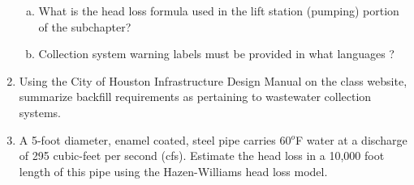 \documentclass[12pt]{article}
\begin{document}
\begin{enumerate}
\begin{enumerate}[a)]
\item What is the head loss formula used in the lift station (pumping) portion of the subchapter?
\item Collection system warning labels must be provided in what languages ?
\end{enumerate}
\item Using the City of Houston Infrastructure Design Manual on the class website, summarize backfill requirements as pertaining to wastewater collection systems. 
\item A 5-foot diameter, enamel coated, steel pipe carries 60$^o$F water at a discharge of 295 cubic-feet per second (cfs).  Estimate the head loss in a 10,000 foot length of this pipe using the Hazen-Williams head loss model.




\end{enumerate}
\end{document}
